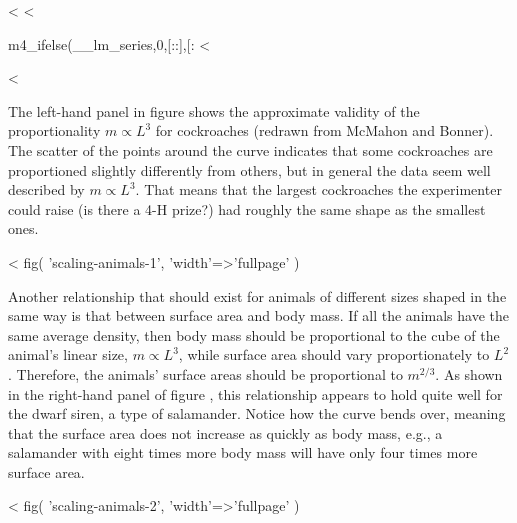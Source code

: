 <%
<%


m4_ifelse(__lm_series,0,[::],[:
<%

<%

The left-hand panel in figure  
shows the approximate
validity of the proportionality $m\propto L^3$ for cockroaches
(redrawn from McMahon and Bonner).  The scatter of the
points around the curve indicates that some cockroaches are
proportioned slightly differently from others, but in
general the data seem well described by $m\propto L^3$. That
means that the largest cockroaches the experimenter could
raise (is there a 4-H prize?) had roughly the same shape
as the smallest ones.

<%
  fig(
    'scaling-animals-1',
    {
      'width'=>'fullpage'
    }
  )

Another relationship that should exist for animals of
different sizes shaped in the same way is that between
surface area and body mass. If all the animals have the same
average density, then body mass should be proportional to
the cube of the animal's linear size, $m\propto L^3$, while
surface area should vary proportionately to $L^2$.
Therefore, the animals' surface areas should be proportional
to $m^{2/3}$. As shown in the right-hand panel of figure
, this relationship
appears to hold quite well for the dwarf siren, a type of
salamander. Notice how the curve bends
over, meaning that the surface area does not increase as
quickly as body mass, e.g., a salamander with eight times
more body mass will have only four times more surface area.

<%
  fig(
    'scaling-animals-2',
    {
      'width'=>'fullpage'
    }
  )

